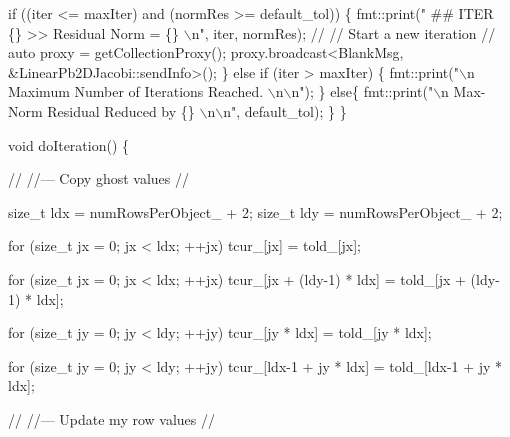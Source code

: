 \begin{DoxyCodeInclude}
    \textcolor{keywordflow}{if} ((iter <= maxIter) and (normRes >= default\_tol)) \{
      fmt::print(\textcolor{stringliteral}{" ## ITER \{\} >> Residual Norm = \{\} \(\backslash\)n"}, iter, normRes);
      \textcolor{comment}{//}
      \textcolor{comment}{// Start a new iteration}
      \textcolor{comment}{//}
      \textcolor{keyword}{auto} proxy = getCollectionProxy();
      proxy.broadcast<BlankMsg, &LinearPb2DJacobi::sendInfo>();
    \}
    \textcolor{keywordflow}{else} \textcolor{keywordflow}{if} (iter > maxIter) \{
      fmt::print(\textcolor{stringliteral}{"\(\backslash\)n Maximum Number of Iterations Reached. \(\backslash\)n\(\backslash\)n"});
    \}
    \textcolor{keywordflow}{else}\{
      fmt::print(\textcolor{stringliteral}{"\(\backslash\)n Max-Norm Residual Reduced by \{\} \(\backslash\)n\(\backslash\)n"}, default\_tol);
    \}
  \}


  \textcolor{keywordtype}{void} doIteration() \{

    \textcolor{comment}{//}
    \textcolor{comment}{//--- Copy ghost values}
    \textcolor{comment}{//}

    \textcolor{keywordtype}{size\_t} ldx = numRowsPerObject\_ + 2;
    \textcolor{keywordtype}{size\_t} ldy = numRowsPerObject\_ + 2;

    \textcolor{keywordflow}{for} (\textcolor{keywordtype}{size\_t} jx = 0; jx < ldx; ++jx)
      tcur\_[jx] = told\_[jx];

    \textcolor{keywordflow}{for} (\textcolor{keywordtype}{size\_t} jx = 0; jx < ldx; ++jx)
      tcur\_[jx + (ldy-1) * ldx] = told\_[jx + (ldy-1) * ldx];

    \textcolor{keywordflow}{for} (\textcolor{keywordtype}{size\_t} jy = 0; jy < ldy; ++jy)
      tcur\_[jy * ldx] = told\_[jy * ldx];

    \textcolor{keywordflow}{for} (\textcolor{keywordtype}{size\_t} jy = 0; jy < ldy; ++jy)
      tcur\_[ldx-1 + jy * ldx] = told\_[ldx-1 + jy * ldx];

    \textcolor{comment}{//}
    \textcolor{comment}{//--- Update my row values}
    \textcolor{comment}{//}


\end{DoxyCodeInclude}
